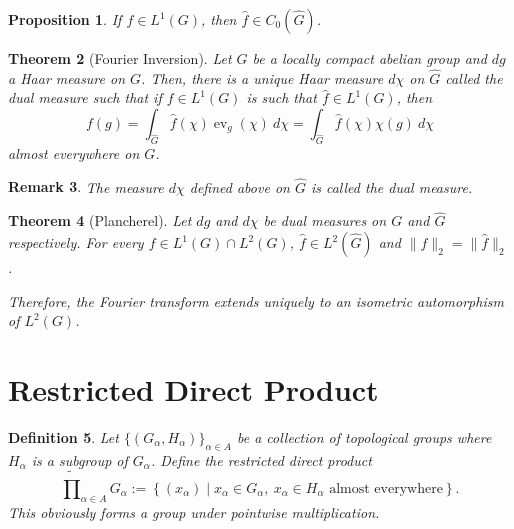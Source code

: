 \documentclass[12pt]{article}
\theoremstyle{thmstyle}
\newtheorem{theorem}{Theorem}[section]
\newtheorem{proposition}[theorem]{Proposition}
\theoremstyle{defstyle}
\newtheorem{definition}[theorem]{Definition}
\newtheorem{remark}[theorem]{Remark}
\newcommand{\wt}[1]{\widetilde{#1}}
\newcommand{\wh}[1]{\widehat{#1}}
\newcommand{\ev}{\operatorname{ev}}
\begin{document}
\begin{proposition}
    If $f\in L^1(G)$, then $\wh f\in C_0(\wh G)$.
\end{proposition}

\begin{theorem}[Fourier Inversion]
    Let $G$ be a locally compact abelian group and $dg$ a Haar measure on $G$. Then, there is a unique Haar measure $d\chi$ on $\wh G$ called the \emph{dual measure} such that if $f\in L^1(G)$ is such that $\wh f\in L^1(G)$, then 
    \begin{equation*}
        f(g) = \int_{\wh G}\wh f(\chi)\ev_g(\chi)~d\chi = \int_{\wh G}\wh f(\chi)\chi(g)~d\chi
    \end{equation*}
    almost everywhere on $G$.
\end{theorem}

\begin{remark}
    The measure $d\chi$ defined above on $\wh G$ is called the \emph{dual measure}.
\end{remark}

\begin{theorem}[Plancherel]
    Let $dg$ and $d\chi$ be dual measures on $G$ and $\wh G$ respectively. For every $f\in L^1(G)\cap L^2(G)$, $\wh f\in L^2(\wh G)$ and $\|f\|_2 = \|\wh f\|_2$.

    Therefore, the Fourier transform extends uniquely to an isometric automorphism of $L^2(G)$.
\end{theorem}

\section{Restricted Direct Product}

\begin{definition}
    Let $\{(G_\alpha, H_\alpha)\}_{\alpha\in A}$ be a collection of topological groups where $H_\alpha$ is a subgroup of $G_\alpha$. Define the restricted direct product 
    \begin{equation*}
        \wt\prod_{\alpha\in A} G_\alpha := \left\{(x_\alpha)\mid x_\alpha\in G_\alpha,~x_\alpha\in H_\alpha \text{ almost everywhere}\right\}.
    \end{equation*}
    This obviously forms a group under pointwise multiplication.
\end{definition}

\newpage


\end{document}
